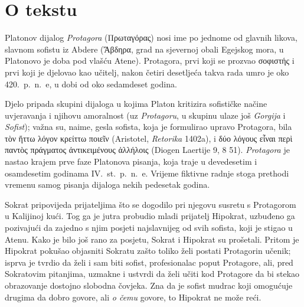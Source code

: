 


\section*{O tekstu}

Platonov dijalog \textit{Protagora} \textgreek[variant=ancient]{(Πρωταγόρας)} nosi ime po jednome od glavnih likova, slavnom sofistu iz Abdere (\textgreek[variant=ancient]{Ἄβδηρα}, grad na sjevernoj obali Egejskog mora, u Platonovo je doba pod vlašću Atene). Protagora, prvi koji se prozvao \textgreek[variant=ancient]{σοφιστής} i prvi koji je djelovao kao učitelj, nakon četiri desetljeća takva rada umro je oko 420.\ p.~n.~e, u dobi od oko sedamdeset godina. 

Djelo pripada skupini dijaloga u kojima Platon kritizira sofističke
načine uvjeravanja i njihovu amoralnost (uz \textit{Protagoru}, u skupinu ulaze još \textit{Gorgija} i \textit{Sofist}); važna su, naime, gesla sofista, koja je formulirao upravo Protagora, bila \textgreek[variant=ancient]{τὸν ἥττω λόγον κρείττω ποιεῖν} (Aristotel, \textit{Retorika} 1402a), i \textgreek[variant=ancient]{δύο λόγους εἶναι περὶ παντὸς πράγματος ἀντικειμένους ἀλλήλοις} (Diogen Laertije 9, 8 51). \textit{Protagora} je nastao krajem prve faze Platonova pisanja, koja traje u devedesetim i osamdesetim godinama IV.~st.\ p.~n.~e. Vrijeme fiktivne radnje stoga prethodi vremenu samog pisanja dijaloga nekih pedesetak godina.

Sokrat pripovijeda prijateljima što se dogodilo pri njegovu susretu s Protagorom u Kalijinoj kući. Tog ga je jutra probudio mladi prijatelj Hipokrat, uzbuđeno ga pozivajući da zajedno s njim posjeti najslavnijeg od svih sofista, koji je stigao u Atenu. Kako je bilo još rano za posjetu, Sokrat i Hipokrat su prošetali. Pritom je Hipokrat pokušao objasniti Sokratu zašto toliko želi postati Protagorin učenik; isprva je tvrdio da želi i sam biti sofist, profesionalac poput Protagore, ali, pred Sokratovim pitanjima, uzmakne i ustvrdi da želi učiti kod Protagore da bi stekao obrazovanje dostojno slobodna čovjeka. Zna da je sofist mudrac koji omogućuje drugima da dobro govore, ali \textit{o čemu} govore, to Hipokrat ne može reći.


